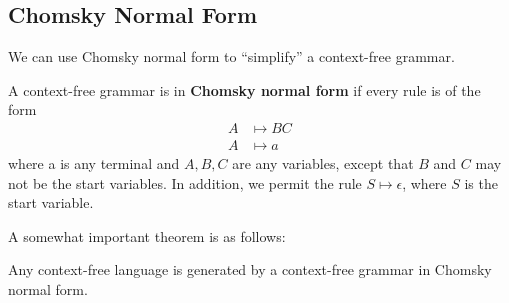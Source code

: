 \documentclass[letterpaper]{article}
\begin{document}
\subsection{Chomsky Normal Form}
We can use Chomsky normal form to ``simplify'' a context-free grammar. 
\begin{definition}{}{}
    A context-free grammar is in \textbf{Chomsky normal form} if every rule is of the form 
    \begin{equation*}
        \begin{aligned}
            A &\mapsto BC \\ 
            A &\mapsto a
        \end{aligned}
    \end{equation*}
    where a is any terminal and $A, B, C$ are any variables, except that $B$ and $C$ may not be the start variables. In addition, we permit the rule $S \mapsto \epsilon$, where $S$ is the start variable.  
\end{definition}

A somewhat important theorem is as follows:
\begin{theorem}{}{}
    Any context-free language is generated by a context-free grammar in Chomsky normal form. 
\end{theorem}
\end{document}
